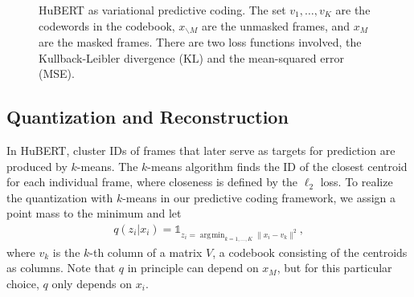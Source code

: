 \documentclass[11pt,a4paper]{article}
\newcommand{\KL}{\mathrm{KL}}
\DeclareMathOperator*{\argmin}{\arg\!\min}
\begin{document}
\begin{figure}
\caption{HuBERT as variational predictive coding.
  The set $v_1, \dots, v_K$ are the codewords in the codebook,
  $x_{\backslash M}$ are the unmasked frames,
  and $x_M$ are the masked frames.
  There are two loss functions involved, the Kullback-Leibler divergence ($\KL$)
  and the mean-squared error (MSE).}
\label{fig:feedforward}
\end{figure}

\subsection{Quantization and Reconstruction}

%
In HuBERT, cluster IDs of frames that later serve as targets
for prediction are produced by $k$-means.
The $k$-means algorithm finds the ID of the closest centroid
for each individual frame, where closeness is defined by the $\ell_2$ loss.
To realize the quantization with $k$-means in our predictive coding framework,
we assign a point mass to the minimum and let
\begin{align}
q(z_i|x_i) = \mathbb{1}_{z_i = \argmin_{k=1, \dots, K} \|x_i - v_k\|^2},
\label{eq:argmin}
\end{align}
where $v_k$ is the $k$-th column of a matrix $V$, a codebook consisting of the centroids as columns.
Note that $q$ in principle can depend on $x_M$, but for this particular choice,
$q$ only depends on $x_i$.
%
%
\end{document}
